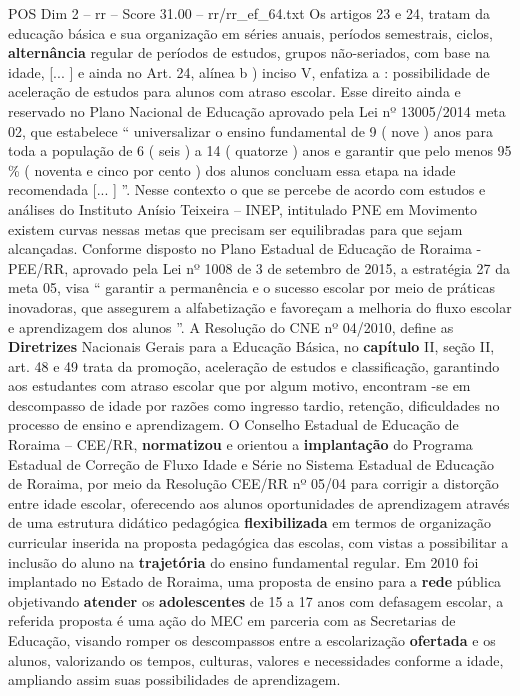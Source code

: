 \begin{textsample}{POS Dim 2 – rr – Score 31.00 – rr/rr\_ef\_64.txt}
Os artigos 23 e 24, tratam da educação básica e sua organização em séries anuais, períodos semestrais, ciclos, \textbf{alternância} regular de períodos de estudos, grupos não-seriados, com base na idade, [... ] e ainda no Art. 24, alínea b ) inciso V, enfatiza a : possibilidade de aceleração de estudos para alunos com atraso escolar.
Esse direito ainda e reservado no Plano Nacional de Educação aprovado pela Lei nº 13005/2014 meta 02, que estabelece “ universalizar o ensino fundamental de 9 ( nove ) anos para toda a população de 6 ( seis ) a 14 ( quatorze ) anos e garantir que pelo menos 95 \% ( noventa e cinco por cento ) dos alunos concluam essa etapa na idade recomendada [... ] ”.
Nesse contexto o que se percebe de acordo com estudos e análises do Instituto Anísio Teixeira – INEP, intitulado PNE em Movimento existem curvas nessas metas que precisam ser equilibradas para que sejam alcançadas.
Conforme disposto no Plano Estadual de Educação de Roraima - PEE/RR, aprovado pela Lei nº 1008 de 3 de setembro de 2015, a estratégia 27 da meta 05, visa “ garantir a permanência e o sucesso escolar por meio de práticas inovadoras, que assegurem a alfabetização e favoreçam a melhoria do fluxo escolar e aprendizagem dos alunos ”.
A Resolução do CNE nº 04/2010, define as \textbf{Diretrizes} Nacionais Gerais para a Educação Básica, no \textbf{capítulo} II, seção II, art. 48 e 49 trata da promoção, aceleração de estudos e classificação, garantindo aos estudantes com atraso escolar que por algum motivo, encontram -se em descompasso de idade por razões como ingresso tardio, retenção, dificuldades no processo de ensino e aprendizagem.
O Conselho Estadual de Educação de Roraima – CEE/RR, \textbf{normatizou} e orientou a \textbf{implantação} do Programa Estadual de Correção de Fluxo Idade e Série no Sistema Estadual de Educação de Roraima, por meio da Resolução CEE/RR nº 05/04 para corrigir a distorção entre idade escolar, oferecendo aos alunos oportunidades de aprendizagem através de uma estrutura didático pedagógica \textbf{flexibilizada} em termos de organização curricular inserida na proposta pedagógica das escolas, com vistas a possibilitar a inclusão do aluno na \textbf{trajetória} do ensino fundamental regular.
Em 2010 foi implantado no Estado de Roraima, uma proposta de ensino para a \textbf{rede} pública objetivando \textbf{atender} os \textbf{adolescentes} de 15 a 17 anos com defasagem escolar, a referida proposta é uma ação do MEC em parceria com as Secretarias de Educação, visando romper os descompassos entre a escolarização \textbf{ofertada} e os alunos, valorizando os tempos, culturas, valores e necessidades conforme a idade, ampliando assim suas possibilidades de aprendizagem.

\end{textsample}
